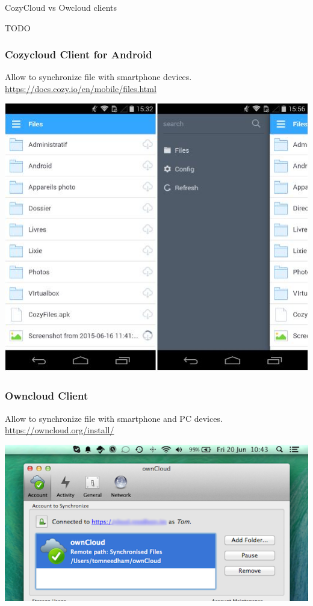 \documentclass{beamer}
\begin{document}
\begin{frame}

\Huge{\centerline{CozyCloud vs Owcloud clients}}
\Huge{\centerline{TODO}}
\end{frame}
\begin{frame}
\frametitle{Cozycloud Client for Android}
\begin{justifying}
Allow to synchronize file with smartphone devices.
\\\url{https://docs.cozy.io/en/mobile/files.html}
\end{justifying}
\begin{center}
\includegraphics[scale=0.4] {./CozyCloud/CozyCloud_AndroidClient01.jpg}
\end{center}
\end{frame}
\begin{frame}
\frametitle{Owncloud Client}
\begin{justifying}
Allow to synchronize file with smartphone and PC devices.\\
\url{https://owncloud.org/install/}
\end{justifying}
\begin{center}
\includegraphics[scale=0.4] {./Owncloud/Owncloud_Client01.png}
\end{center}
\end{frame}
\end{document}
